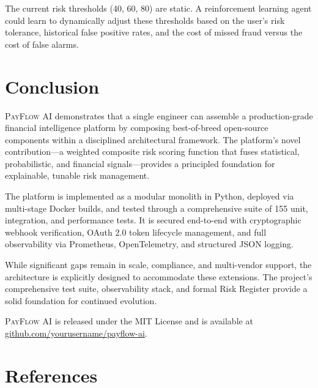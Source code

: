\documentclass[11pt,a4paper]{article}
\newcommand{\payflow}{\textsc{PayFlow AI}}
\begin{document}
\begin{definitionbox}
The current risk thresholds (40, 60, 80) are static. A reinforcement learning agent could learn to dynamically adjust these thresholds based on the user's risk tolerance, historical false positive rates, and the cost of missed fraud versus the cost of false alarms.
\end{definitionbox}


\section{Conclusion}
\label{sec:conclusion}

\payflow{} demonstrates that a single engineer can assemble a production-grade financial intelligence platform by composing best-of-breed open-source components within a disciplined architectural framework. The platform's novel contribution---a weighted composite risk scoring function that fuses statistical, probabilistic, and financial signals---provides a principled foundation for explainable, tunable risk management.

The platform is implemented as a modular monolith in Python, deployed via multi-stage Docker builds, and tested through a comprehensive suite of 155 unit, integration, and performance tests. It is secured end-to-end with cryptographic webhook verification, OAuth 2.0 token lifecycle management, and full observability via Prometheus, OpenTelemetry, and structured JSON logging.

While significant gaps remain in scale, compliance, and multi-vendor support, the architecture is explicitly designed to accommodate these extensions. The project's comprehensive test suite, observability stack, and formal Risk Register provide a solid foundation for continued evolution.

\payflow{} is released under the MIT License and is available at \href{https://github.com/yourusername/payflow-ai}{github.com/yourusername/payflow-ai}.


\section*{References}
\end{document}
